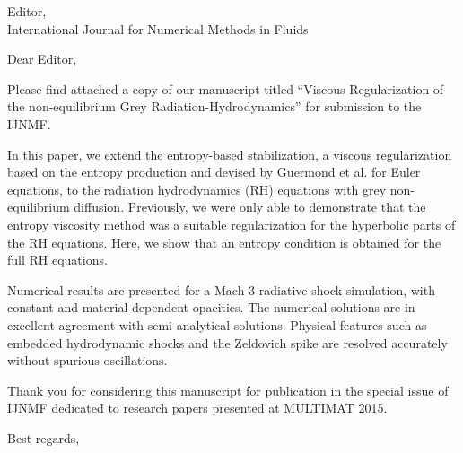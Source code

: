 \begin{letter}{
    Editor,\\
    International Journal for Numerical Methods in Fluids}
\date{\today}

\opening{Dear Editor,}
         \vspace{0.25cm}

Please find attached a copy of our manuscript titled ``Viscous Regularization of the non-equilibrium Grey Radiation-Hydrodynamics'' for submission to the IJNMF. 

In this paper, we extend the entropy-based stabilization, a viscous regularization based on the entropy production and devised by Guermond et al. for Euler equations, to the radiation hydrodynamics (RH) equations with grey non-equilibrium diffusion. Previously, we were only able to demonstrate that the entropy viscosity method was a suitable regularization for the hyperbolic parts of the RH equations. Here, we show that an entropy condition is obtained for the full RH equations. 

Numerical results are presented for a Mach-3 radiative shock simulation, with constant and material-dependent opacities. The numerical solutions are in excellent agreement with semi-analytical solutions. Physical features such as embedded hydrodynamic shocks and the Zeldovich spike are resolved accurately without spurious oscillations. 

Thank you for considering this manuscript for publication in the special issue of IJNMF dedicated to research papers presented at MULTIMAT 2015.




\closing{Best regards, }

\end{letter}


